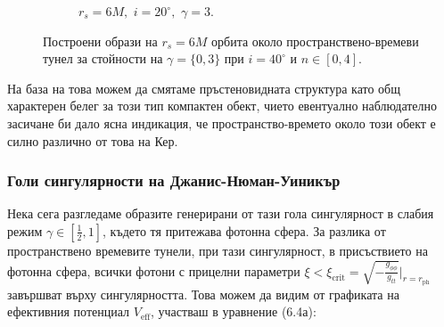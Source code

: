 \begin{figure}[!htb]
\begin{subfigure}{6cm}
		\caption{$r_s = 6M,\,\, i = 20^\circ,\,\,\gamma = 3$.}
	\end{subfigure}
	\caption[Построени образи на $r_s = 6M$ орбита около пространствено-времеви тунел за различни стойности на $\gamma$ при $i \ 20^\circ$.]{\small Построени образи на $r_s = 6M$ орбита около пространствено-времеви тунел за стойности на $\gamma = \{0, 3\}$ при $i = 40^\circ$ и $n\in[0,4]$.} 
	\label{WH_gamma_20_deg}
\end{figure}
На база на това можем да смятаме пръстеновидната структура като общ характерен белег за този тип компактен обект, чието евентуално наблюдателно засичане би дало ясна индикация, че пространство-времето около този обект е силно различно от това на Кер.
\newpage
\subsubsection{Голи сингулярности на Джанис-Нюман-Уиникър}

Нека сега разгледаме образите генерирани от тази гола сингулярност в слабия режим $\gamma\in\left[\frac{1}{2},1\right]$, където тя притежава фотонна сфера. За разлика от пространствено времевите тунели, при тази сингулярност, в присъствието на фотонна сфера, всички фотони с прицелни параметри $\xi <\xi_\text{crit} = \sqrt{-\frac{g_{\phi\phi}}{g_{tt}}}\big\vert_{r = r_\text{ph}}$ завършват върху сингулярността. Това можем да видим от графиката на ефективния потенциал $V_\text{eff}$, участваш в уравнение (6.4а):

